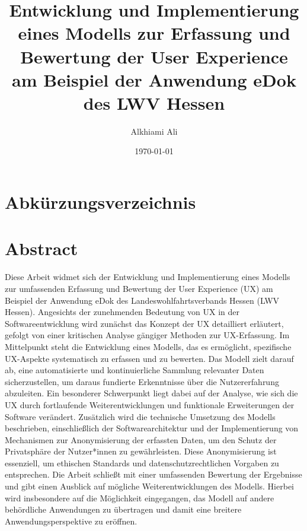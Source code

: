 \documentclass[a4paper,12pt]{report}
\title{Entwicklung und Implementierung eines Modells zur Erfassung und Bewertung der User Experience am Beispiel der Anwendung eDok des LWV Hessen}
\author{Alkhiami Ali}
\date{\today}
\begin{document}
\maketitle
\tableofcontents
\chapter*{Abkürzungsverzeichnis}
\begin{acronym}[hyperlinks]
\end{acronym}
\chapter{Abstract}
Diese Arbeit widmet sich der Entwicklung und Implementierung eines Modells zur umfassenden Erfassung und Bewertung der User Experience (UX) am Beispiel der Anwendung eDok des Landeswohlfahrtsverbands Hessen (LWV Hessen). Angesichts der zunehmenden Bedeutung von UX in der Softwareentwicklung wird zunächst das Konzept der UX detailliert erläutert, gefolgt von einer kritischen Analyse gängiger Methoden zur UX-Erfassung. Im Mittelpunkt steht die Entwicklung eines Modells, das es ermöglicht, spezifische UX-Aspekte systematisch zu erfassen und zu bewerten. Das Modell zielt darauf ab, eine automatisierte und kontinuierliche Sammlung relevanter Daten sicherzustellen, um daraus fundierte Erkenntnisse über die Nutzererfahrung abzuleiten. Ein besonderer Schwerpunkt liegt dabei auf der Analyse, wie sich die UX durch fortlaufende Weiterentwicklungen und funktionale Erweiterungen der Software verändert. Zusätzlich wird die technische Umsetzung des Modells beschrieben, einschließlich der Softwarearchitektur und der Implementierung von Mechanismen zur Anonymisierung der erfassten Daten, um den Schutz der Privatsphäre der Nutzer*innen zu gewährleisten. Diese Anonymisierung ist essenziell, um ethischen Standards und datenschutzrechtlichen Vorgaben zu entsprechen. Die Arbeit schließt mit einer umfassenden Bewertung der Ergebnisse und gibt einen Ausblick auf mögliche Weiterentwicklungen des Modells. Hierbei wird insbesondere auf die Möglichkeit eingegangen, das Modell auf andere behördliche Anwendungen zu übertragen und damit eine breitere Anwendungsperspektive zu eröffnen.
\end{document}
